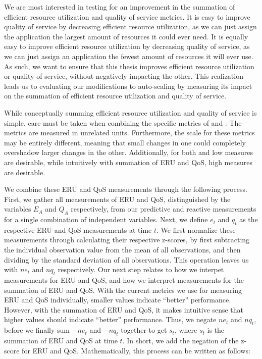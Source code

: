 We are most interested in testing for an improvement in the summation of
efficient resource utilization and quality of service metrics. It is
easy to improve quality of service by decreasing efficient resource
utilization, as we can just assign the application the largest amount of
resources it could ever need. It is equally easy to improve efficient resource
utilization by decreasing quality of service, as we can just assign an
application the fewest amount of resources it will ever use. As such, we want to
ensure that this thesis improves efficient resource utilization or quality of
service, without negatively impacting the other. This realization leads us to
evaluating our modifications to auto-scaling by measuring its impact on the
summation of efficient resource utilization and quality of service.

While conceptually summing efficient resource utilization and quality of service
is simple, care must be taken when combining the specific metrics of
 and . The metrics are measured in unrelated
units. Furthermore, the scale for these metrics may be entirely different,
meaning that small changes in one could completely overshadow larger changes in
the other. Additionally, for both  and  low
measures are desirable, while intuitively with summation of ERU and QoS, high
measures are desirable.

We combine these ERU and QoS measurements through the following process.
First, we gather all measurements of ERU and QoS,
distinguished by the variables $E_{A}$ and $Q_{A}$ respectively, from our
predictive and reactive measurements for a single combination of independent
variables. Next, we define $e_{t}$ and $q_{t}$ as the
respective ERU and QoS measurements at time $t$. We first
normalize these measurements through calculating their respective z-scores,
by first subtracting the individual observation value
from the mean of all observations, and then dividing by the standard deviation of all
observations. This operation leaves us with $ne_{t}$ and $nq_{t}$ respectively.
Our next step relates to how we interpet measurements for ERU and QoS, and how
we interpret measurements for the summation of ERU and QoS. With the current
metrics we use for measuring ERU and QoS individually, smaller values indicate
``better'' performance. However, with the summation of ERU and QoS, it makes
intuitive sense that higher values should indicate ``better'' performance.
Thus, we negate $ne_{t}$ and $nq_{t}$, before we finally sum
$-ne_{t}$ and $-nq_{t}$ together to get $s_{t}$, where $s_{t}$ is the summation
of ERU and QoS at time $t$.
In short, we add the negation of the z-score for
ERU and QoS. Mathematically, this process can be written as
follows:

